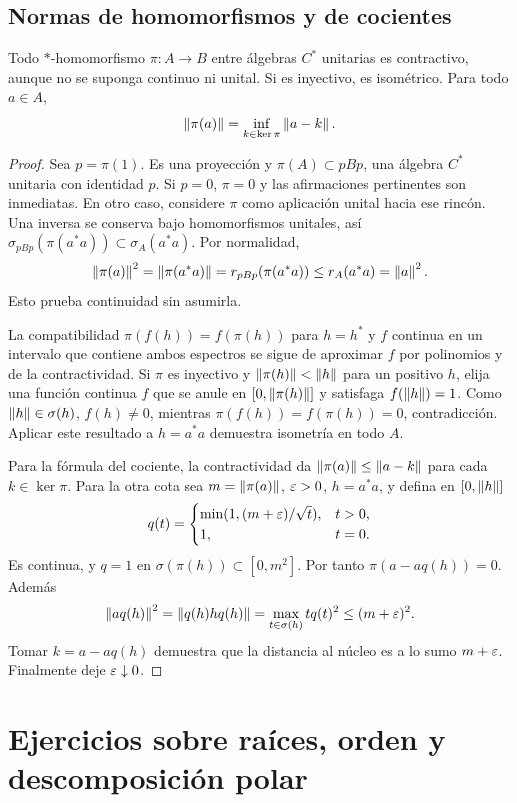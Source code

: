 \subsection{Normas de homomorfismos y de cocientes}
\begin{proposicion}\label{v3:homomorfismo-cstar-norma}
Todo $*$-homomorfismo $\pi:A\to B$ entre álgebras $C^*$ unitarias es contractivo, aunque no se suponga continuo ni unital. Si es inyectivo, es isométrico. Para todo $a\in A$,
\[
 \left\lVert\pi(a)\right\rVert=\inf_{k\in\ker\pi}\left\lVert a-k\right\rVert.
\]
\end{proposicion}
\begin{proof}
Sea $p=\pi(1)$. Es una proyección y $\pi(A)\subset pBp$, una álgebra $C^*$ unitaria con identidad $p$. Si $p=0$, $\pi=0$ y las afirmaciones pertinentes son inmediatas. En otro caso, considere $\pi$ como aplicación unital hacia ese rincón. Una inversa se conserva bajo homomorfismos unitales, así $\sigma_{pBp}(\pi(a^*a))\subset\sigma_A(a^*a)$. Por normalidad,
\[
 \left\lVert\pi(a)\right\rVert^2=\left\lVert\pi(a^*a)\right\rVert
 =r_{pBp}(\pi(a^*a))\le r_A(a^*a)=\left\lVert a\right\rVert^2.
\]
Esto prueba continuidad sin asumirla.

La compatibilidad $\pi(f(h))=f(\pi(h))$ para $h=h^*$ y $f$ continua en un intervalo que contiene ambos espectros se sigue de aproximar $f$ por polinomios y de la contractividad. Si $\pi$ es inyectivo y $\left\lVert\pi(h)\right\rVert<\left\lVert h\right\rVert$ para un positivo $h$, elija una función continua $f$ que se anule en $[0,\left\lVert\pi(h)\right\rVert]$ y satisfaga $f(\left\lVert h\right\rVert)=1$. Como $\left\lVert h\right\rVert\in\sigma(h)$, $f(h)\ne0$, mientras $\pi(f(h))=f(\pi(h))=0$, contradicción. Aplicar este resultado a $h=a^*a$ demuestra isometría en todo $A$.

Para la fórmula del cociente, la contractividad da $\left\lVert\pi(a)\right\rVert\le\left\lVert a-k\right\rVert$ para cada $k\in\ker\pi$. Para la otra cota sea $m=\left\lVert\pi(a)\right\rVert$, $\varepsilon>0$, $h=a^*a$, y defina en $[0,\left\lVert h\right\rVert]$
\[
 q(t)=\begin{cases}\min(1,(m+\varepsilon)/\sqrt t),&t>0,\\1,&t=0.\end{cases}
\]
Es continua, y $q=1$ en $\sigma(\pi(h))\subset[0,m^2]$. Por tanto $\pi(a-aq(h))=0$. Además
\[
 \left\lVert aq(h)\right\rVert^2=\left\lVert q(h)hq(h)\right\rVert
 =\max_{t\in\sigma(h)}tq(t)^2\le(m+\varepsilon)^2.
\]
Tomar $k=a-aq(h)$ demuestra que la distancia al núcleo es a lo sumo $m+\varepsilon$. Finalmente deje $\varepsilon\downarrow0$.
\end{proof}

\section{Ejercicios sobre raíces, orden y descomposición polar}


